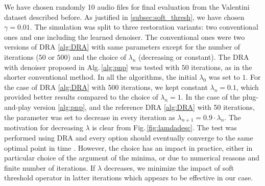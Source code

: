 \documentclass[conference]{IEEEtran}
\newcommand{\todo}[1]{\textcolor{red}{#1}}
\begin{document}
We have chosen randomly 10 audio files for final evaluation from the Valentini dataset \cite{ValentiniBotinhao2017} described before.
As justified in \ref{subsec:soft_thresh}, we have chosen $\gamma = 0.01$.
The simulation was split to three restoration variants: two conventional ones and one including the learned denoiser.
The conventional ones were two versions of DRA \ref{alg:DRA} with same parameters except for the number of iterations ($50$ or $500$) and the choice of $\lambda_n$ (decreasing or constant).
The DRA with denoiser proposed in Alg.\,\ref{alg:pnp} was tested with $50$ iterations,
as in the shorter conventional method.
In all the algorithms, the initial $\lambda_0$ was set to $1$. %
For the case of DRA \ref{alg:DRA} with 500 iterations, we kept constant $\lambda_n = 0.1$, which provided better results compared to the choice of $\lambda_n = 1$.
In the case of the plug-and-play version \ref{alg:pnp}, and the reference DRA \ref{alg:DRA} with 50 iterations, the parameter was set to decrease in every iteration as $\lambda_{n+1} = 0.9\cdot\lambda_n$.
The motivation for decreasing $\lambda$ is clear from Fig.\,\ref{fig:lamdadesc}.
The test was performed using DRA and every option should eventually converge to the same optimal point in time \cite{Combettes2011}.
However, the choice has an impact in practice, either in particular choice of the argument of the minima, or due to numerical reasons and finite number of iterations.
If $\lambda$ decreases, we minimize the impact of soft threshold operator in latter iterations which appears to be effective in our case.
\end{document}
